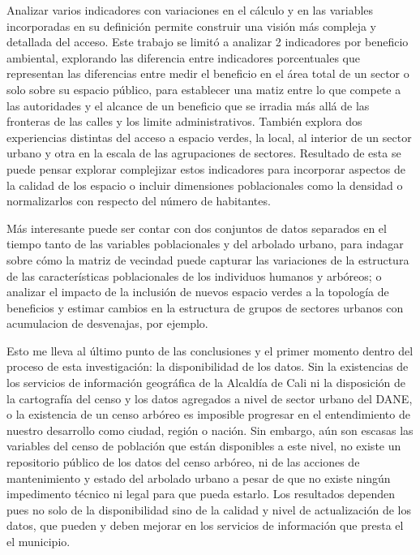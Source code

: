 \documentclass[12pt,]{book}
\begin{document}
Analizar varios indicadores con variaciones en el cálculo y en las
variables incorporadas en su definición permite construir una visión más
compleja y detallada del acceso. Este trabajo se limitó a analizar 2
indicadores por beneficio ambiental, explorando las diferencia entre
indicadores porcentuales que representan las diferencias entre medir el
beneficio en el área total de un sector o solo sobre su espacio público,
para establecer una matiz entre lo que compete a las autoridades y el
alcance de un beneficio que se irradia más allá de las fronteras de las
calles y los limite administrativos. También explora dos experiencias
distintas del acceso a espacio verdes, la local, al interior de un
sector urbano y otra en la escala de las agrupaciones de sectores.
Resultado de esta se puede pensar explorar complejizar estos indicadores
para incorporar aspectos de la calidad de los espacio o incluir
dimensiones poblacionales como la densidad o normalizarlos con respecto
del número de habitantes.

Más interesante puede ser contar con dos conjuntos de datos separados en
el tiempo tanto de las variables poblacionales y del arbolado urbano,
para indagar sobre cómo la matriz de vecindad puede capturar las
variaciones de la estructura de las características poblacionales de los
individuos humanos y arbóreos; o analizar el impacto de la inclusión de
nuevos espacio verdes a la topología de beneficios y estimar cambios en
la estructura de grupos de sectores urbanos con acumulacion de
desvenajas, por ejemplo.

Esto me lleva al último punto de las conclusiones y el primer momento
dentro del proceso de esta investigación: la disponibilidad de los
datos. Sin la existencias de los servicios de información geográfica de
la Alcaldía de Cali ni la disposición de la cartografía del censo y los
datos agregados a nivel de sector urbano del DANE, o la existencia de un
censo arbóreo es imposible progresar en el entendimiento de nuestro
desarrollo como ciudad, región o nación. Sin embargo, aún son escasas
las variables del censo de población que están disponibles a este nivel,
no existe un repositorio público de los datos del censo arbóreo, ni de
las acciones de mantenimiento y estado del arbolado urbano a pesar de
que no existe ningún impedimento técnico ni legal para que pueda
estarlo. Los resultados dependen pues no solo de la disponibilidad sino
de la calidad y nivel de actualización de los datos, que pueden y deben
mejorar en los servicios de información que presta el el municipio.


\end{document}
